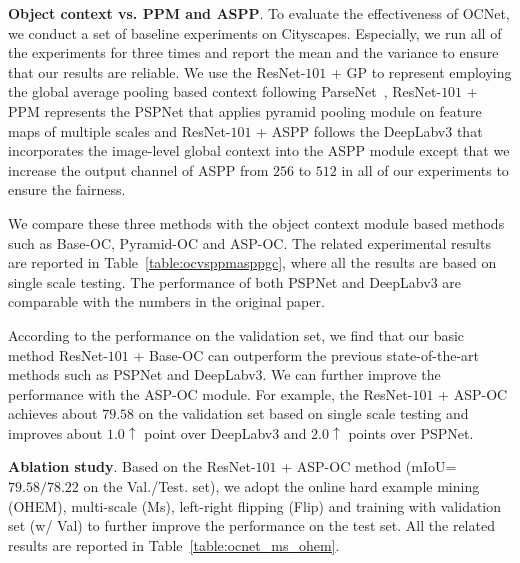 \documentclass[10pt,twocolumn,letterpaper]{article}
\begin{document}
\vspace{0.1cm}
\noindent\textbf{Object context vs. PPM and ASPP}.
To evaluate the effectiveness of OCNet, we conduct a set of baseline experiments on Cityscapes.
Especially, we run all of the experiments for three times and report the mean and the variance to ensure that our results are reliable.
We use the ResNet-$101$ + GP to represent employing the global average pooling based context following ParseNet~\cite{liu2015parsenet}, ResNet-$101$ + PPM represents the PSPNet that applies pyramid pooling module on feature maps of multiple scales and ResNet-$101$ + ASPP follows the DeepLabv3 that incorporates the image-level global context into the ASPP module except that we increase the output channel of ASPP from $256$ to $512$ in all of our experiments to ensure the fairness.

We compare these three methods with the object context module based methods such as Base-OC, Pyramid-OC and ASP-OC. The related experimental results are reported in Table~\ref{table:ocvsppmasppgc}, where all the results are based on single scale testing.
The performance of both PSPNet and DeepLabv3 are comparable with the numbers in the original paper.


According to the performance on the validation set,
we find that our basic method ResNet-$101$ + Base-OC can outperform the previous state-of-the-art methods such as PSPNet and DeepLabv3.
We can further improve the performance with the ASP-OC module. For example, the ResNet-$101$ + ASP-OC achieves about $79.58$ on the validation set based on single scale testing and improves about $1.0 \uparrow $ point over DeepLabv3 and $2.0 \uparrow $ points over PSPNet.


\vspace{0.1cm}
\noindent\textbf{Ablation study}.
Based on the ResNet-$101$ + ASP-OC method (mIoU=$79.58/78.22$ on the Val./Test. set), we adopt the online hard example mining (OHEM), multi-scale (Ms), left-right flipping (Flip) and training with validation set (w/ Val)  to further improve the performance on the test set.
All the related results are reported in Table~\ref{table:ocnet_ms_ohem}.
\end{document}
